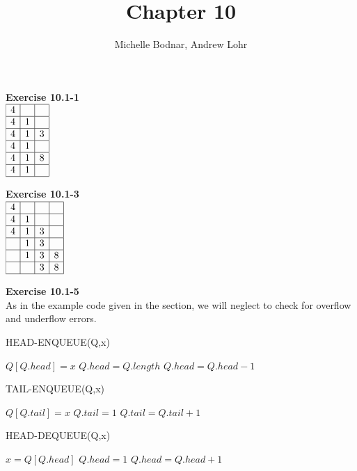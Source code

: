 \documentclass{article}
\title{Chapter 10}
\author{Michelle Bodnar, Andrew Lohr}
\begin{document}
\maketitle

\noindent\textbf{ Exercise 10.1-1} \\
$
\begin{array}{|c|c|c|}
\hline
4&&\\
\hline
4&1&\\
\hline
4&1&3\\
\hline
4&1&\\
\hline
4&1&8\\
\hline
4&1&\\
\hline
\end{array}
$


\noindent\textbf{ Exercise 10.1-3} \\
$
\begin{array}{|c|c|c|c|}
\hline
4&&&\\
\hline
4&1&&\\
\hline
4&1&3&\\
\hline
&1&3&\\
\hline
&1&3&8\\
\hline
&&3&8\\
\hline
\end{array}
$



\noindent\textbf{ Exercise 10.1-5} \\
As in the example code given in the section, we will neglect to check for overflow and underflow errors.

\begin{algorithm}
\caption{HEAD-ENQUEUE(Q,x)}
\begin{algorithmic}
\State $Q[Q.head] = x$
\State $Q.head = Q.length$
\Else
\State $Q.head = Q.head-1$
\EndIf
\end{algorithmic}
\end{algorithm}

\begin{algorithm}
\caption{TAIL-ENQUEUE(Q,x)}
\begin{algorithmic}
\State $Q[Q.tail] = x$
\State $Q.tail = 1$
\Else
\State $Q.tail = Q.tail+1$
\EndIf
\end{algorithmic}
\end{algorithm}

\begin{algorithm}
\caption{HEAD-DEQUEUE(Q,x)}
\begin{algorithmic}
\State $x = Q[Q.head] $
\State $Q.head = 1$
\Else
\State $Q.head = Q.head+1$
\EndIf
\end{algorithmic}
\end{algorithm}
\end{document}
